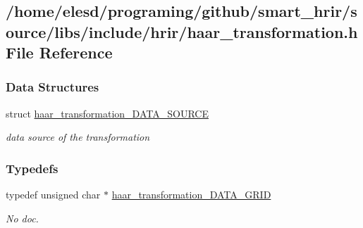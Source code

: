 \hypertarget{a00009}{\subsection{/home/elesd/programing/github/smart\-\_\-hrir/source/libs/include/hrir/haar\-\_\-transformation.h File Reference}
\label{a00009}
}
\subsubsection*{Data Structures}
\begin{DoxyCompactItemize}
\item 
struct \hyperlink{a00001}{haar\-\_\-transformation\-\_\-\-D\-A\-T\-A\-\_\-\-S\-O\-U\-R\-C\-E}
\begin{DoxyCompactList}\small\item\em data source of the transformation \end{DoxyCompactList}\end{DoxyCompactItemize}
\subsubsection*{Typedefs}
\begin{DoxyCompactItemize}
\item 
\hypertarget{a00009_a15c000e971023d4dd5ea1540870dad05}{typedef unsigned char $\ast$ \hyperlink{a00009_a15c000e971023d4dd5ea1540870dad05}{haar\-\_\-transformation\-\_\-\-D\-A\-T\-A\-\_\-\-G\-R\-I\-D}}\label{a00009_a15c000e971023d4dd5ea1540870dad05}

\begin{DoxyCompactList}\small\item\em No doc. \end{DoxyCompactList}\end{DoxyCompactItemize}
